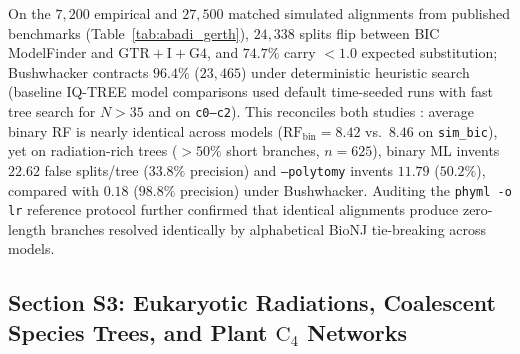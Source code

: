 \documentclass[12pt]{article}
\begin{document}
On the $7,200$ empirical and $27,500$ matched simulated alignments from published benchmarks \cite{abadi2019model,gerth2019cannot} (Table~\ref{tab:abadi_gerth}), $24,338$ splits flip between BIC ModelFinder and $\text{GTR}+\text{I}+\text{G4}$, and $74.7\%$ carry $<1.0$ expected substitution; Bushwhacker contracts $96.4\%$ ($23,465$) under deterministic heuristic search (baseline IQ-TREE model comparisons used default time-seeded runs with fast tree search for $N>35$ and on \texttt{c0--c2}). This reconciles both studies \cite{ripplinger2008does,spielman2020relative}: average binary RF is nearly identical across models ($\text{RF}_{\text{bin}} = 8.42$ vs.\ $8.46$ on \texttt{sim\_bic}), yet on radiation-rich trees ($>50\%$ short branches, $n=625$), binary ML invents $22.62$ false splits/tree ($33.8\%$ precision) and \texttt{--polytomy} invents $11.79$ ($50.2\%$), compared with $0.18$ ($98.8\%$ precision) under Bushwhacker. Auditing the \texttt{phyml -o lr} reference protocol \cite{abadi2019model} further confirmed that identical alignments produce zero-length branches resolved identically by alphabetical BioNJ tie-breaking across models.

\subsection*{Section S3: Eukaryotic Radiations, Coalescent Species Trees, and Plant $\text{C}_4$ Networks}
\end{document}
